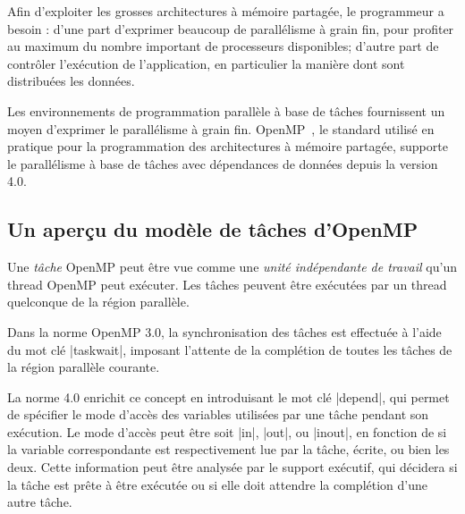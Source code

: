 \documentclass[parallelisme]{compas2016}
\begin{document}
Afin d'exploiter les grosses architectures à mémoire partagée, le programmeur a besoin :
d'une part d'exprimer beaucoup de parallélisme à grain fin, pour profiter au
maximum du nombre important de processeurs disponibles; d'autre part de contrôler
l'exécution de l'application, en particulier la manière dont sont distribuées
les données.

Les environnements de programmation parallèle à base de tâches fournissent un moyen
d'exprimer le parallélisme à grain fin. OpenMP~\cite{openmp40}, le standard utilisé
en pratique pour la programmation des architectures à mémoire partagée, supporte
le parallélisme à base de tâches avec dépendances de données depuis la version 4.0.

\subsection{Un aperçu du modèle de tâches d'OpenMP}

Une \emph{tâche} OpenMP peut être vue comme une \emph{unité indépendante de travail} qu'un thread
OpenMP peut exécuter. Les tâches peuvent être exécutées par un thread quelconque
de la région parallèle.

Dans la norme OpenMP 3.0, la synchronisation des tâches est effectuée à l'aide du
mot clé |taskwait|, imposant l'attente de la complétion de toutes les tâches
de la région parallèle courante.

La norme 4.0 enrichit ce concept en introduisant le mot clé |depend|, qui permet
de spécifier le mode d'accès des variables utilisées par une tâche pendant son exécution.
Le mode d'accès peut être soit |in|, |out|, ou |inout|, en fonction de si la
variable correspondante est respectivement lue par la tâche, écrite, ou bien les deux.
Cette information peut être analysée par le support exécutif, qui décidera si
la tâche est prête à être exécutée ou si elle doit attendre la complétion d'une
autre tâche.



\end{document}
